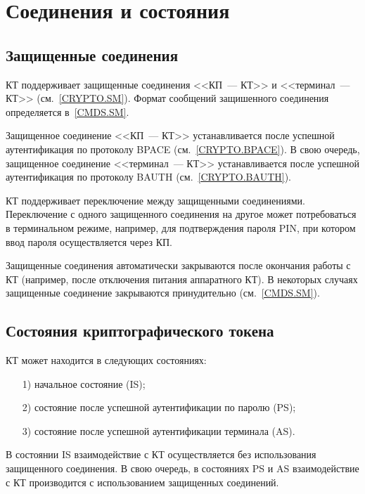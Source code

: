 \chapter{Соединения и состояния}\label{STATES}

\section{Защищенные соединения}\label{STATES.SM}

КТ поддерживает защищенные соединения 
<<КП~--- КТ>> и <<терминал~--- КТ>> (см.~\ref{CRYPTO.SM}). 
Формат сообщений защишенного соединения определяется в~\ref{CMDS.SM}.

Защищенное соединение <<КП~--- КТ>> устанавливается 
после успешной аутентификация по протоколу BPACE (см.~\ref{CRYPTO.BPACE}).
В свою очередь, защищенное соединение <<терминал~--- КТ>> устанавливается 
после успешной аутентификация по протоколу BAUTH (см.~\ref{CRYPTO.BAUTH}).

КТ поддерживает переключение между защищенными соединениями.
Переключение с одного защищенного соединения на другое 
может потребоваться в терминальном режиме, например,
для подтверждения пароля PIN, при котором ввод пароля 
осуществляется через КП. 

Защищенные соединения автоматически закрываются 
после окончания работы с КТ (например, 
после отключения питания аппаратного КТ).
В некоторых случаях защищенные соединение 
закрываются принудительно (см.~\ref{CMDS.SM}).

\section{Состояния криптографического токена}\label{STATES.ST}

КТ может находится в следующих состояниях:
%
\begin{itemize}
\item[1)]
начальное состояние (IS);
\item[2)]
состояние после успешной аутентификации по паролю (PS);
\item[3)]
состояние после успешной аутентификации терминала (AS).
\end{itemize}
В состоянии IS взаимодействие с КТ осуществляется без использования 
защищенного соединения. 
В свою очередь, в состояниях PS и AS взаимодействие 
с КТ производится с использованием защищенных соединений.
 

